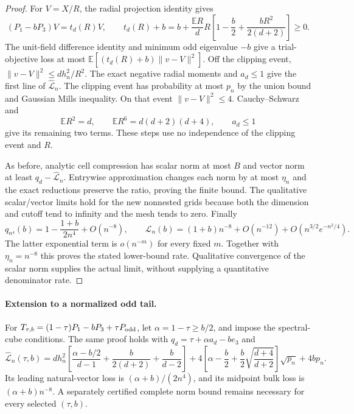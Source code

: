 \documentclass[11pt]{article}
\begin{document}
\begin{proof}
For $V=X/R$, the radial projection identity gives
\[
 (P_1-bP_3)V=t_d(R)V,\qquad
 t_d(R)+b=b+\frac{\mathbb ER}{d}R
           \left[1-\frac b2+\frac{bR^2}{2(d+2)}\right]\geq0.
\]
The unit-field difference identity and minimum odd eigenvalue $-b$
give a trial-objective loss at most
$\mathbb E[(t_d(R)+b)\|v-V\|^2]$.
Off the clipping event, $\|v-V\|^2\leq dh_n^2/R^2$.
The exact negative radial moments and $a_d\leq1$ give the first
line of $\widehat{\mathcal L}_n$.  The clipping event has probability
at most $p_n$ by the union bound and Gaussian Mills inequality.
On that event $\|v-V\|^2\leq4$.  Cauchy--Schwarz and
\[
 \mathbb ER^2=d,\qquad \mathbb ER^6=d(d+2)(d+4),\qquad a_d\leq1
\]
give its remaining two terms.  These steps use no independence of
the clipping event and $R$.

As before, analytic cell compression has scalar norm at most $B$
and vector norm at least $q_d-\widehat{\mathcal L}_n$.
Entrywise approximation changes each norm by at most $\eta_n$ and
the exact reductions preserve the ratio, proving the finite bound.
The qualitative scalar/vector limits hold for the new nonnested
grids because both the dimension and cutoff tend to infinity and
the mesh tends to zero.
Finally
\[
 q_{n^4}(b)=1-\frac{1+b}{2n^4}+O(n^{-8}),\qquad
 \widehat{\mathcal L}_n(b)=(1+b)n^{-8}+O(n^{-12})
                         +O(n^{3/2}e^{-n^2/4}).
\]
The latter exponential term is $o(n^{-m})$ for every fixed $m$.
Together with $\eta_n=n^{-8}$ this proves the stated lower-bound
rate.  Qualitative convergence of the scalar norm supplies the
actual limit, without supplying a quantitative denominator rate.
\end{proof}

\paragraph{Extension to a normalized odd tail.}
For $T_{\tau,b}=(1-\tau)P_1-bP_3+\tau P_{\rm odd}$, let
$\alpha=1-\tau\geq b/2$, and impose the spectral-cube conditions.
The same proof holds with $q_d=\tau+\alpha a_d-be_3$ and
\[
 \widehat{\mathcal L}_n(\tau,b)=dh_n^2
 \left[\frac{\alpha-b/2}{d-1}+\frac b{2(d+2)}+\frac b{d-2}\right]
 +4\left[\alpha-\frac b2+\frac b2\sqrt{\frac{d+4}{d+2}}\right]
                       \sqrt{p_n}+4bp_n.
\]
Its leading natural-vector loss is $(\alpha+b)/(2n^4)$, and its
midpoint bulk loss is $(\alpha+b)n^{-8}$.  A separately certified
complete norm bound remains necessary for every selected $(\tau,b)$.
\end{document}
